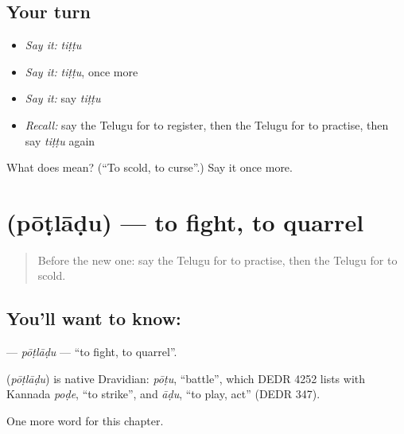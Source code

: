 \subsection*{Your turn}
\begin{itemize}
\raggedright
  \item \emph{Say it:} \emph{tiṭṭu}
  \item \emph{Say it:} \emph{tiṭṭu}, once more
  \item \emph{Say it:} say \emph{tiṭṭu}
  \item \emph{Recall:} say the Telugu for to register, then the Telugu for to practise, then say \emph{tiṭṭu} again
\end{itemize}

\begin{tcolorbox}[breakable,colback=teal!4,colframe=teal!35!black,title={Before you move on}]
What does  mean? (\textquotedblleft{}To scold, to curse\textquotedblright{}.) Say it once more.
\end{tcolorbox}
\section[\texorpdfstring{\te{పోట్లాడు} (pōṭlāḍu)}{పోట్లాడు (pōṭlāḍu)}]{ (pōṭlāḍu) — to fight, to quarrel}

\label{lesson:TE-C203-potladu}



\begin{quote}
Before the new one: say the Telugu for to practise, then the Telugu for to scold.
\end{quote}

\subsection*{You'll want to know: }
\textbf{} — \emph{pōṭlāḍu} — \textquotedblleft{}to fight, to quarrel\textquotedblright{}.

\begin{cousinweb}
\textbf{} (\emph{pōṭlāḍu}) is native Dravidian: \emph{pōṭu}, \textquotedblleft{}battle\textquotedblright{}, which DEDR 4252 lists with Kannada \emph{poḍe}, \textquotedblleft{}to strike\textquotedblright{}, and \emph{āḍu}, \textquotedblleft{}to play, act\textquotedblright{} (DEDR 347).
\end{cousinweb}

\begin{grammarlens}[title={What you've built}]
One more word for this chapter.
\end{grammarlens}


